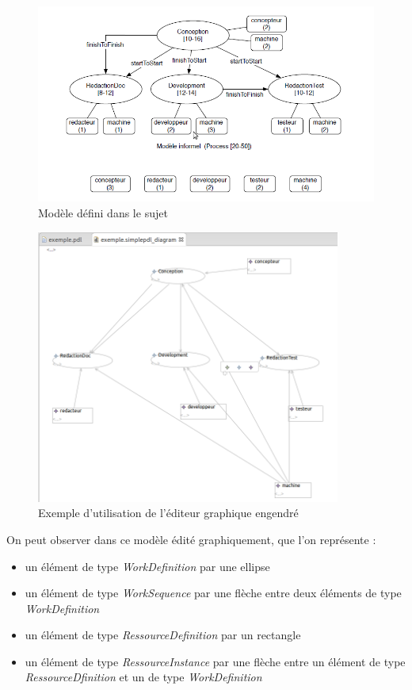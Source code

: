 \documentclass{report}
\begin{document}
\begin{figure}[!h] 
\begin{center}
\includegraphics[width=15cm]{Capture-6.png}
\caption{Modèle défini dans le sujet} 
\label{img1} 
\end{center}
\end{figure} 

\begin{figure}[!h] 
\begin{center}
\includegraphics[width=10cm]{Capture-8.png}
\caption{Exemple d'utilisation de l'éditeur graphique engendré} 
\label{img1} 
\end{center}
\end{figure}

On peut observer dans ce modèle édité graphiquement, que l'on représente :
\begin{itemize}
\item un élément de type \textit{WorkDefinition} par une ellipse
\item un élément de type \textit{WorkSequence} par une flèche entre deux éléments de type \textit{WorkDefinition}
\item un élément de type \textit{RessourceDefinition} par un rectangle
\item un élément de type \textit{RessourceInstance} par une flèche entre un élément de type \textit{RessourceDfinition} et un de type \textit{WorkDefinition}\\
\end{itemize}
\end{document}
